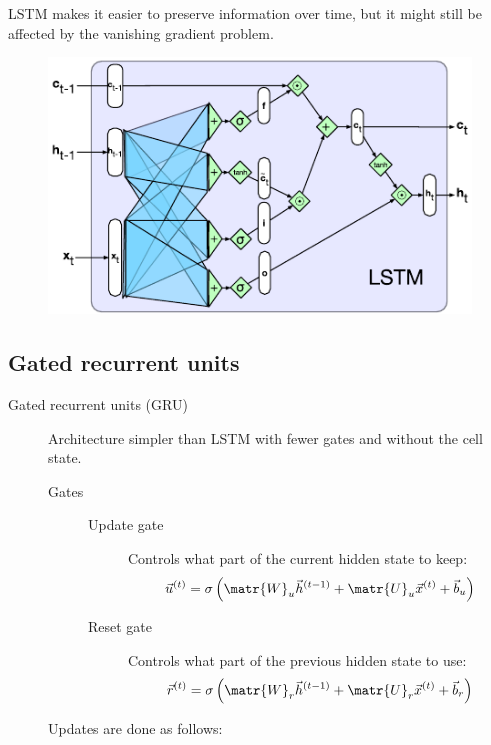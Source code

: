 \begin{description}
        \begin{remark}
            LSTM makes it easier to preserve information over time, but it might still be affected by the vanishing gradient problem.
        \end{remark}

        \begin{figure}[H]
            \centering
            \includegraphics[width=0.5\linewidth]{./img/_lstm.pdf}
        \end{figure}
\end{description}


\subsection{Gated recurrent units}

\begin{description}
    \item[Gated recurrent units (GRU)] 
        Architecture simpler than LSTM with fewer gates and without the cell state.

        \begin{description}
            \item[Gates] \phantom{}
                \begin{description}
                    \item[Update gate] 
                        Controls what part of the current hidden state to keep:
                        \[ \vec{u}^{(t)} = \sigma\left( \matr{W}_u \vec{h}^{(t-1)} + \matr{U}_u \vec{x}^{(t)} + \vec{b}_u \right) \]
        
                    \item[Reset gate] 
                        Controls what part of the previous hidden state to use:
                        \[ \vec{r}^{(t)} = \sigma\left( \matr{W}_r \vec{h}^{(t-1)} + \matr{U}_r \vec{x}^{(t)} + \vec{b}_r \right) \]
                \end{description}
        \end{description}

        Updates are done as follows:
\end{description}

